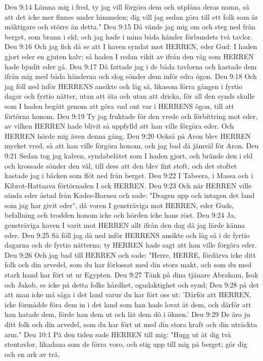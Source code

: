 Deu 9:14  Lämna mig i fred, ty jag vill förgöra dem och utplåna deras namn, så att det icke mer finnes under himmelen; dig vill jag sedan göra till ett folk som är mäktigare och större än detta."
Deu 9:15  Då vände jag mig om och steg ned från berget, som brann i eld; och jag hade i mina båda händer förbundets två tavlor.
Deu 9:16  Och jag fick då se att I haven syndat mot HERREN, eder Gud: I haden gjort eder en gjuten kalv; så haden I redan vikit av ifrån den väg som HERREN hade bjudit eder gå.
Deu 9:17  Då fattade jag i de båda tavlorna och kastade dem ifrån mig med båda händerna och slog sönder dem inför edra ögon.
Deu 9:18  Och jag föll ned inför HERRENS ansikte och låg så, likasom förra gången i fyrtio dagar och fyrtio nätter, utan att äta och utan att dricka, för all den synds skulle som I haden begått genom att göra vad ont var i HERRENS ögon, till att förtörna honom.
Deu 9:19  Ty jag fruktade för den vrede och förbittring mot eder, av vilken HERREN hade blivit så uppfylld att han ville förgöra eder. Och HERREN hörde mig även denna gång.
Deu 9:20  Också på Aron blev HERREN mycket vred, så att han ville förgöra honom, och jag bad då jämväl för Aron.
Deu 9:21  Sedan tog jag kalven, syndabelätet som I haden gjort, och brände den i eld och krossade sönder den väl, till dess att den blev fint stoft, och det stoftet kastade jag i bäcken som flöt ned från berget.
Deu 9:22  I Tabeera, i Massa och i Kibrot-Hattaava förtörnaden I ock HERREN.
Deu 9:23  Och när HERREN ville sända eder åstad från Kades-Barnea och sade: "Dragen upp och intagen det land som jag har givit eder", då voren I gensträviga mot HERREN, eder Guds, befallning och trodden honom icke och hörden icke hans röst.
Deu 9:24  Ja, gensträviga haven I varit mot HERREN allt ifrån den dag då jag lärde känna eder.
Deu 9:25  Så föll jag då ned inför HERRENS ansikte och låg så i de fyrtio dagarna och de fyrtio nätterna; ty HERREN hade sagt att han ville förgöra eder.
Deu 9:26  Och jag bad till HERREN och sade: "Herre, HERRE, fördärva icke ditt folk och din arvedel, som du har förlossat med din stora makt, och som du med stark hand har fört ut ur Egypten.
Deu 9:27  Tänk på dina tjänare Abraham, Isak och Jakob, se icke på detta folks hårdhet, ogudaktighet och synd;
Deu 9:28  på det att man icke må säga i det land varur du har fört oss ut: 'Därför att HERREN, icke förmådde föra dem in i det land som han hade lovat åt dem, och därför att han hatade dem, förde han dem ut och lät dem dö i öknen.'
Deu 9:29  De äro ju ditt folk och din arvedel, som du har fört ut med din stora kraft och din uträckta arm."
Deu 10:1  På den tiden sade HERREN till mig: "Hugg ut åt dig två stentavlor, likadana som de förra voro, och stig upp till mig på berget; gör dig och en ark av trä.
